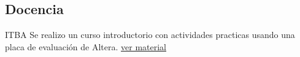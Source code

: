 \documentclass[11pt,a4paper,sans]{moderncv} 	%
\begin{document}
	\subsection{Docencia}
	 	{ITBA} 		{}{}{Se realizo un curso introductorio con actividades practicas usando una placa de evaluación de Altera. \href{http://disenioconingenio.com.ar/shop/docs/fpga.pdf} {ver material}}

\end{document}
